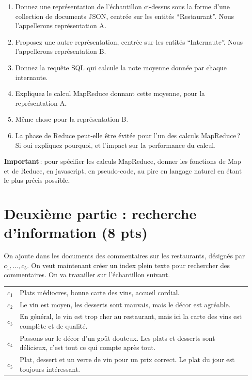 \documentclass[10pt,a4paper]{article}
\begin{document}
\begin{enumerate}
  \item Donnez une représentation de l'échantillon ci-dessus sous la forme d'une collection
      de documents JSON, centrée sur les entités ``Restaurant''. 
      Nous l'appellerons représentation A.
  \item Proposez une autre représentation, centrée sur les entités ``Internaute''.  Nous l'appellerons représentation B.
             \item Donnez la requête SQL qui calcule la note moyenne donnée par chaque internaute.
           \item Expliquez le calcul MapReduce donnant cette moyenne, pour la représentation A.
           \item Même chose pour la représentation B.
           \item La phase de Reduce peut-elle être évitée pour l'un des calculs MapReduce\,?
                Si oui expliquez pourquoi, et l'impact sur la performance du calcul. 
\end{enumerate}

\textbf{Important}\,: pour spécifier les calculs MapReduce, donner les fonctions de Map et de Reduce, en javascript,
en pseudo-code, au pire en langage naturel en étant le plus précis possible.


\section*{Deuxième partie : recherche d'information (8 pts)}

On ajoute dans les  documents des commentaires sur les restaurants, désignés
par $c_1, ..., c_5$. On veut maintenant
créer un index plein texte pour rechercher des commentaires. On va travailler sur l'échantillon
suivant.

\vspace*{0.3cm}

\begin{tabular}{lp{15cm}}
     $c_1$& Plats médiocres, bonne carte des vins, accueil cordial.\\
     $c_2$& Le vin est moyen, les desserts sont mauvais, mais le décor est agréable.\\
     $c_3$& En général, le vin est trop cher au restaurant, mais ici la carte
         des vins est complète et de qualité.\\
     $c_4$& Passons sur le décor d'un goût douteux. Les plats et desserts sont délicieux,
          c'est tout ce qui compte après tout.\\
     $c_5$& Plat, dessert et un verre de vin pour un prix correct. Le plat du jour
             est toujours intéressant.\\ 
\end{tabular}
\end{document}
